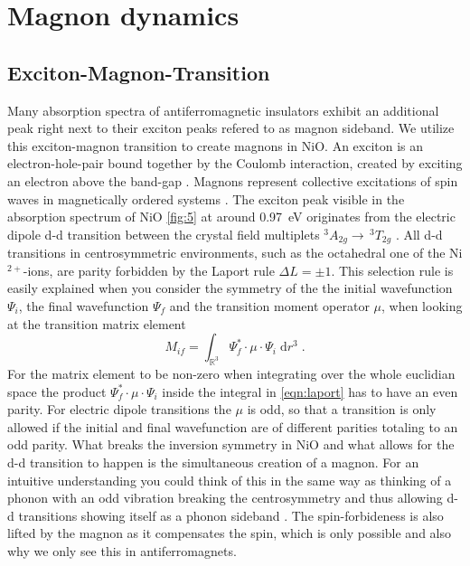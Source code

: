 \section{Magnon dynamics} 
\subsection{Exciton-Magnon-Transition}
\label{sec:x_m}
Many absorption spectra of antiferromagnetic insulators exhibit an additional peak right next to their exciton peaks \cite{sell_review_1968} refered to as magnon sideband.
We utilize this exciton-magnon transition to create magnons in NiO.
An exciton is an electron-hole-pair bound together by the Coulomb interaction, created by exciting an electron above the band-gap \cite{combescot_excitons_2015}.
Magnons represent collective excitations of spin waves in magnetically ordered systems \cite{kittel_magnons_1959}.
The exciton peak visible in the absorption spectrum of NiO \autoref{fig:5} at around \qty{0.97}{eV} originates from the electric dipole d-d transition between the crystal field multiplets $^3A_{2g} \rightarrow \, ^3T_{2g}$ \cite{mironova-ulmane_influence_2005}.
All d-d transitions in centrosymmetric environments, such as the octahedral one of the Ni$^{2+}$-ions, are parity forbidden by the Laport rule $\Delta L = \pm 1$.
This selection rule is easily explained when you consider the symmetry of the the initial wavefunction $\Psi_i$, the final wavefunction $\Psi_f$ and the transition moment operator $\mu$, when looking at the transition matrix element
\begin{equation}
    M_{if} = \int_{\mathbb{R}^3} \Psi^*_f \cdot \mu \cdot \Psi_i \;\text{d}r^3 \;.
    \label{eqn:laport}
\end{equation}
For the matrix element to be non-zero when integrating over the whole euclidian space the product $\Psi^*_f \cdot \mu \cdot \Psi_i$ inside the integral in \autoref{eqn:laport} has to have an even parity.
For electric dipole transitions the $\mu$ is odd, so that a transition is only allowed if the initial and final wavefunction are of different parities totaling to an odd parity.
What breaks the inversion symmetry in NiO and what allows for the d-d transition to happen is the simultaneous creation of a magnon.
For an intuitive understanding you could think of this in the same way as thinking of a phonon with an odd vibration breaking the centrosymmetry and thus allowing d-d transitions showing itself as a phonon sideband \cite{sell_review_1968}.
The spin-forbideness is also lifted by the magnon as it compensates the spin, which is only possible and also why we only see this in antiferromagnets.
